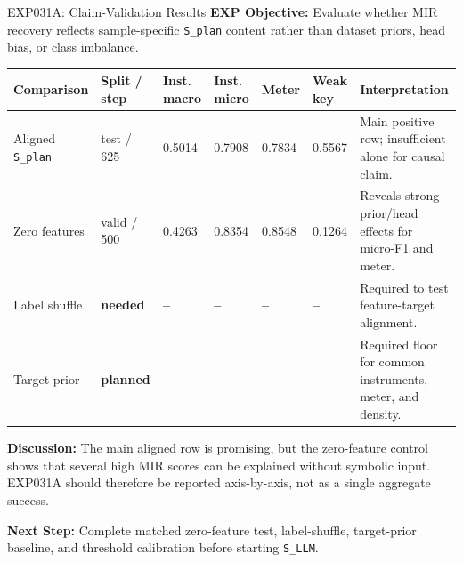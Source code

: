 \documentclass[aspectratio=169,11pt]{beamer}
\newcommand{\missing}[1]{{\color{missingred}\textbf{#1}}}
\newcommand{\code}[1]{\texttt{\footnotesize #1}}
\newcommand{\expfield}[2]{\textbf{#1:} #2\par\vspace{0.10cm}}
\begin{document}
\begin{frame}{EXP031A: Claim-Validation Results}
  \footnotesize
  \expfield{EXP Objective}{Evaluate whether MIR recovery reflects sample-specific \code{S\_plan} content rather than dataset priors, head bias, or class imbalance.}

  \begin{tabularx}{\linewidth}{p{2.05cm}p{1.35cm}p{1.3cm}p{1.3cm}p{1.2cm}p{1.2cm}Y}
    \toprule
    Comparison & Split / step & Inst. macro & Inst. micro & Meter & Weak key & Interpretation \\
    \midrule
    Aligned \code{S\_plan} & test / 625 & 0.5014 & 0.7908 & 0.7834 & 0.5567 & Main positive row; insufficient alone for causal claim. \\
    Zero features & valid / 500 & 0.4263 & 0.8354 & 0.8548 & 0.1264 & Reveals strong prior/head effects for micro-F1 and meter. \\
    Label shuffle & \missing{needed} & \missing{--} & \missing{--} & \missing{--} & \missing{--} & Required to test feature-target alignment. \\
    Target prior & \missing{planned} & \missing{--} & \missing{--} & \missing{--} & \missing{--} & Required floor for common instruments, meter, and density. \\
    \bottomrule
  \end{tabularx}

  \vspace{0.18cm}
  \expfield{Discussion}{The main aligned row is promising, but the zero-feature control shows that several high MIR scores can be explained without symbolic input. EXP031A should therefore be reported axis-by-axis, not as a single aggregate success.}
  \expfield{Next Step}{Complete matched zero-feature test, label-shuffle, target-prior baseline, and threshold calibration before starting \code{S\_LLM}.}
\end{frame}
\end{document}
